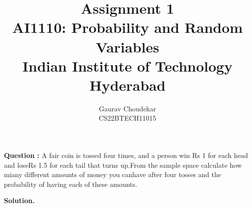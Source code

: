 \documentclass[journal,12pt,twocolumn]{IEEEtran}
\begin{document}
\let\vec\mathbf

\title{Assignment 1 \\ \Large AI1110: Probability and Random Variables \\ \Large Indian Institute of Technology Hyderabad}
\author{Gaurav Choudekar \\ \normalsize CS22BTECH11015}

        \maketitle	
	\textbf{Question :}
	A fair coin is tossed four times, and a person win  Rs 1 for each head and loseRs 1.5 for each tail that turns up.From the sample space calculate how miany different amounts of money you canhave after four tosses and the probability of having each of these amounts.
       
	\textbf{Solution.}
\end{document}
